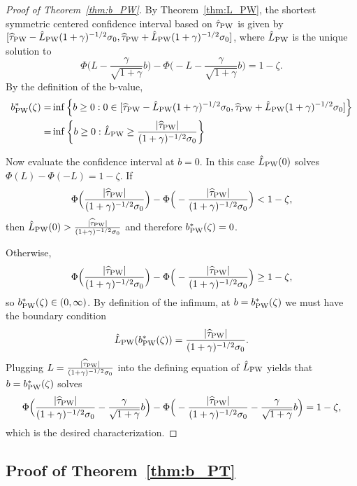 \documentclass[11pt]{article}
\newcommand{\htau}{\widehat\tau}
\numberwithin{equation}{section}
\theoremstyle{definition}
\begin{document}
\begin{proof}[Proof of Theorem~\ref{thm:b_PW}]

By Theorem~\ref{thm:L_PW}, the shortest symmetric centered confidence interval based on $\hat\tau_{\rm PW}$ is given by $[\htau_{\rm PW} - \hat{L}_{\rm PW} (1+\gamma)^{-1/2} \sigma_0, \htau_{\rm PW} + \hat{L}_{\rm PW} (1+\gamma)^{-1/2} \sigma_0]$, where $\hat{L}_{\rm PW}$ is the unique solution to
\[
  \Phi\Big(L - \frac{\gamma}{\sqrt{1+\gamma}} b \Big) - \Phi\Big(-L - \frac{\gamma}{\sqrt{1+\gamma}} b \Big) = 1-\zeta.
\]
By the definition of the b-value,
\begin{align*}
  b^*_{\rm PW}(\zeta) =& \inf\left\{b \ge 0: 0 \in [\htau_{\rm PW} - \hat{L}_{\rm PW} (1+\gamma)^{-1/2} \sigma_0, \htau_{\rm PW} + \hat{L}_{\rm PW} (1+\gamma)^{-1/2} \sigma_0]\right\}\\
  =& \inf\left\{b \ge 0: \hat{L}_{\rm PW} \ge \frac{\lvert \htau_{\rm PW} \rvert}{(1+\gamma)^{-1/2} \sigma_0}\right\}
\end{align*}

Now evaluate the confidence interval at $b=0$. In this case $\hat L_{\rm PW}(0)$ solves
$\Phi(L)-\Phi(-L)=1-\zeta$. If
\[
  \Phi\Big(\frac{\lvert \htau_{\rm PW} \rvert}{(1+\gamma)^{-1/2} \sigma_0}\Big) - \Phi\Big(-\frac{\lvert \htau_{\rm PW} \rvert}{(1+\gamma)^{-1/2} \sigma_0}\Big) < 1-\zeta,
\]
then $\hat{L}_{\rm PW}(0) > \frac{\lvert \htau_{\rm PW} \rvert}{(1+\gamma)^{-1/2} \sigma_0}$ and therefore $b^*_{\rm PW}(\zeta)=0$.

Otherwise,
\[
  \Phi\Big(\frac{\lvert \htau_{\rm PW} \rvert}{(1+\gamma)^{-1/2} \sigma_0}\Big) - \Phi\Big(-\frac{\lvert \htau_{\rm PW} \rvert}{(1+\gamma)^{-1/2} \sigma_0}\Big) \ge 1-\zeta,
\]
so $b^*_{\rm PW}(\zeta) \in (0, \infty)$. By definition of the infimum,
at $b=b^*_{\rm PW}(\zeta)$ we must have the boundary condition
\[
\hat L_{\rm PW}(b^*_{\rm PW}(\zeta))
=
\frac{\lvert \htau_{\rm PW} \rvert}{(1+\gamma)^{-1/2}\sigma_0}.
\]
Plugging $L=\frac{\lvert \htau_{\rm PW} \rvert}{(1+\gamma)^{-1/2} \sigma_0}$ into the defining equation of $\hat{L}_{\rm PW}$ yields that $b = b^*_{\rm PW}(\zeta)$ solves
\[
  \Phi\Big(\frac{\lvert \htau_{\rm PW} \rvert}{(1+\gamma)^{-1/2} \sigma_0} - \frac{\gamma}{\sqrt{1+\gamma}} b \Big) - \Phi\Big(-\frac{\lvert \htau_{\rm PW} \rvert}{(1+\gamma)^{-1/2} \sigma_0}  - \frac{\gamma}{\sqrt{1+\gamma}} b \Big) = 1-\zeta,
\]
which is the desired characterization.

\end{proof}

\subsection{Proof of Theorem~\ref{thm:b_PT}}
\end{document}
